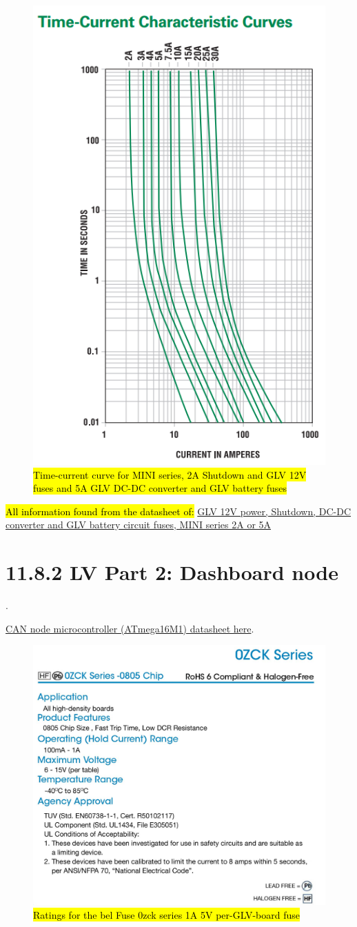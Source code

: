 \documentclass{article}
\DeclareRobustCommand{\hlr}[1]{{\sethlcolor{red}\hl{#1}}}
\begin{document}
\begin{figure}[H]
    \centering
    \includegraphics[width = 0.6 \textwidth]{shutdownfusecurve}
    \caption{\hlr{Time-current curve for MINI series, 2A Shutdown and GLV 12V fuses and 5A GLV DC-DC converter and GLV battery fuses}}
    \label{shutdownfusecurve}
\end{figure}

\hlr{All information found from the datasheet of: }
\href{http://www.littelfuse.com/~/media/automotive/datasheets/fuses/automotive-fuses/littelfuse_automotive_blade_fuse_mini_32v.pdf}{GLV 12V power, Shutdown, DC-DC converter and GLV battery circuit fuses, MINI series 2A or 5A}

\section*{11.8.2 LV Part 2: Dashboard node}.

\href{http://www.atmel.com/images/8209s.pdf}{CAN node microcontroller (ATmega16M1) datasheet here}.

\begin{figure}[H]
    \centering
    \includegraphics[width = 0.7 \textwidth]{1AGLVlowratings}
    \caption{\hlr{Ratings for the bel Fuse 0zck series 1A 5V per-GLV-board fuse}}
    \label{5V1Afuserating}
\end{figure}
\end{document}
